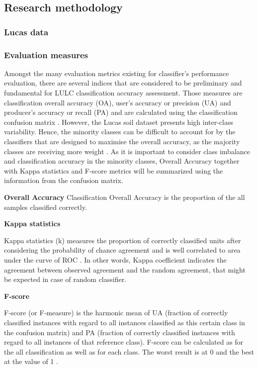 \documentclass[parskip=full]{scrartcl}
\begin{document}
\subsection{Research methodology}

\subsubsection{Lucas data}


\subsubsection{Evaluation measures}
Amongst the many evaluation metrics existing for classifier's performance
evaluation, there are several indices that are considered to be preliminary and
fundamental for LULC classification accuracy assessment. Those measures are
classification overall accuracy (OA), user's accuracy or precision (UA) and
producer's accuracy or recall (PA) and are calculated using the classification
confusion matrix \cite{Liu2007}. However, the Lucas soil dataset presents high
inter-class variability. Hence, the minority classes can be difficult to
account for by the classifiers that are designed to maximise the overall
accuracy, as the majority classes are receiving more weight \cite{Inglada2017}.
As it is important to consider class imbalance and classification accuracy in
the minority classes, Overall Accuracy together with Kappa statistics and
F-score metrics will be summarized using the information from the confusion
matrix.

\textbf{Overall Accuracy}
Classification Overall Accuracy is the proportion of the all samples classified
correctly.

\textbf{Kappa statistics}

Kappa statistics (k) measures the proportion of correctly classified units after
considering the probability of chance agreement and is well correlated to area
under the curve of ROC \cite{Freeman2012}. In other words, Kappa coefficient
indicates the agreement between observed agreement and the random agreement,
that might be expected in case of random classifier.

\textbf{F-score}

F-score (or F-measure) is the harmonic mean of UA (fraction of correctly
classified instances with regard to all instances classified as this certain
class in the confusion matrix) and PA (fraction of correctly classified
instances with regard to all instances of that reference class). F-score can be
calculated as for the all classification as well as for each class. The worst
result is at 0 and the best at the value of 1 \cite{Inglada2017}.





\end{document}
